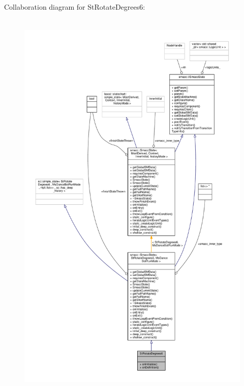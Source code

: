 Collaboration diagram for St\+Rotate\+Degrees6\+:
\nopagebreak
\begin{figure}[H]
\begin{center}
\leavevmode
\includegraphics[height=550pt]{structStRotateDegrees6__coll__graph}
\end{center}
\end{figure}
